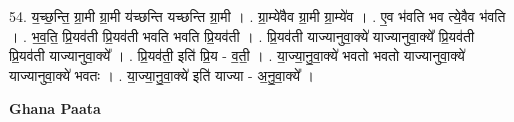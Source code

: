 \documentclass[17pt]{extarticle}
\begin{document}
54. य॒च्छ॒न्ति॒ ग्रा॒मी ग्रा॒मी य॑च्छन्ति यच्छन्ति ग्रा॒मी । . ग्रा॒म्ये॑वैव ग्रा॒मी ग्रा॒म्ये॑व । . ए॒व भ॑वति भव त्ये॒वैव भ॑वति । . भ॒व॒ति॒ प्रि॒यव॑ती प्रि॒यव॑ती भवति भवति प्रि॒यव॑ती । . प्रि॒यव॑ती याज्यानुवा॒क्ये॑ याज्यानुवा॒क्ये᳚ प्रि॒यव॑ती प्रि॒यव॑ती याज्यानुवा॒क्ये᳚ । . प्रि॒यव॑ती॒ इति॑ प्रि॒य - व॒ती॒ । . या॒ज्या॒नु॒वा॒क्ये॑ भवतो भवतो याज्यानुवा॒क्ये॑ याज्यानुवा॒क्ये॑ भवतः । . या॒ज्या॒नु॒वा॒क्ये॑ इति॑ याज्या - अ॒नु॒वा॒क्ये᳚ । \newline

\textbf{Ghana Paata } \newline
\end{document}
